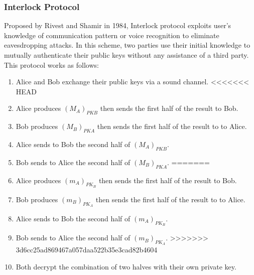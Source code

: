 \subsubsection{Interlock Protocol}

Proposed by Rivest and Shamir in 1984, Interlock protocol exploits user's knowledge of communication pattern or voice recognition to eliminate eavesdropping attacks. In this scheme, two parties use their initial knowledge to mutually authenticate their public keys without any assistance of a third party. This protocol works as follows:
\begin{enumerate}
\item Alice and Bob exchange their public keys via a sound channel. 
<<<<<<< HEAD
\item Alice produces $(M_A)_{PKB}$ then sends the first half of the result to Bob. 
\item Bob produces $(M_B)_{PKA}$ then sends the first half of the result to to Alice. 
\item Alice sends to Bob the second half of $(M_A)_{PKB}$. 
\item Bob sends to Alice the second half of $(M_B)_{PKA}$. 
=======
\item Alice produces $(m_A)_{PK_B}$ then sends the first half of the result to Bob. 
\item Bob produces $(m_B)_{PK_A}$ then sends the first half of the result to to Alice. 
\item Alice sends to Bob the second half of $(m_A)_{PK_B}$. 
\item Bob sends to Alice the second half of $(m_B)_{PK_A}$. 
>>>>>>> 3d6cc25ad869467a057daa522b35e3cad82b4604
\item Both decrypt the combination of two halves with their own private key. 
\end{enumerate}   


